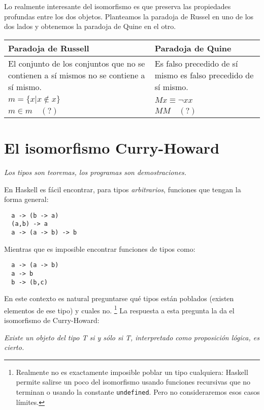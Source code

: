 \documentclass[paper=a4, fontsize=11pt, spanish]{scrartcl} %
\numberwithin{equation}{section} %
\numberwithin{figure}{section} %
\numberwithin{table}{section} %
\begin{document}
    Lo realmente interesante del isomorfismo es que preserva las propiedades profundas entre
    los dos objetos. Planteamos la paradoja de Russel en uno de los dos lados y obtenemos
    la paradoja de Quine en el otro.
    \begin{table}[htbp]
      \centering
      \begin{tabularx}{\textwidth}{X|X}
      \textbf{Paradoja de Russell} & \textbf{Paradoja de Quine} \\
      \hline
      El conjunto de los conjuntos que no se contienen a sí 
      mismos no se contiene a sí mismo. &
      Es falso precedido de sí mismo es falso precedido de sí mismo. \\
	\centerline{$m = \{x | x \notin x\}$} &
	\centerline{$M x \equiv \neg x x$} \\  
	\centerline{$m \in m \quad(?)$} &
	\centerline{$M M \quad(?)$} \\ 
      \end{tabularx}
    \end{table}
    
    
  \section{El isomorfismo Curry-Howard}
    \begin{center}
      \textit{ Los tipos son teoremas, los programas son demostraciones.}
    \end{center}
    
    En Haskell es fácil encontrar, para tipos \textit{arbitrarios}, funciones que tengan la forma
    general:
    \begin{lstlisting}
  a -> (b -> a)
  (a,b) -> a
  a -> (a -> b) -> b
    \end{lstlisting}
    Mientras que es imposible  encontrar funciones de tipos como:
    \begin{lstlisting}
  a -> (a -> b)
  a -> b
  b -> (b,c)
    \end{lstlisting}
    En este contexto es natural preguntarse qué tipos están poblados (existen elementos de
    ese tipo) y cuales no. \footnote{Realmente no es exactamente imposible poblar un tipo cualquiera: Haskell permite salirse un poco
    del isomorfismo usando funciones recursivas que no terminan o usando la constante \texttt{undefined}.
    Pero no consideraremos esos casos límites.} La respuesta a esta pregunta la da el isomorfismo de Curry-Howard:
    \begin{center}
     \textit{Existe un objeto del tipo T si y sólo si T, interpretado como proposición lógica,
      es cierto.}
    \end{center}
    
\end{document}
